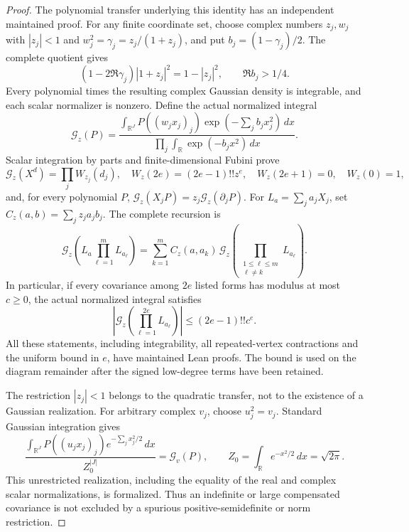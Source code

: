 \begin{proof}
The polynomial transfer underlying this identity has an independent
maintained proof. For any finite coordinate set, choose complex numbers
\(z_j,w_j\) with \(|z_j|<1\) and
\(w_j^2=\gamma_j=z_j/(1+z_j)\), and put
\(b_j=(1-\gamma_j)/2\). The complete quotient gives
\[
 (1-2\Re\gamma_j)|1+z_j|^2=1-|z_j|^2,
 \qquad \Re b_j>1/4.
\]
Every polynomial times the resulting complex Gaussian density is
integrable, and each scalar normalizer is nonzero. Define the actual
normalized integral
\[
 \mathcal G_z(P)=
 \frac{\displaystyle\int_{\mathbb R^J}
      P((w_jx_j)_j)\exp(-\sum_jb_jx_j^2)\,dx}
      {\displaystyle\prod_j\int_{\mathbb R}\exp(-b_jx^2)\,dx}.
\]
Scalar integration by parts and finite-dimensional Fubini prove
\[
 \mathcal G_z(X^d)=\prod_j W_{z_j}(d_j),\quad
 W_z(2e)=(2e-1)!!z^e,\quad W_z(2e+1)=0,\quad W_z(0)=1,
\]
and, for every polynomial \(P\),
\(\mathcal G_z(X_jP)=z_j\mathcal G_z(\partial_jP)\).
For \(L_a=\sum_ja_jX_j\), set
\(C_z(a,b)=\sum_jz_ja_jb_j\). The complete recursion is
\[
 \mathcal G_z\left(L_a\prod_{\ell=1}^mL_{a_\ell}\right)
 =\sum_{k=1}^m C_z(a,a_k)\,
    \mathcal G_z\left(\prod_{\substack{1\leq\ell\leq m\\\ell\ne k}}
                                      L_{a_\ell}\right).
\]
In particular, if every covariance among \(2e\) listed forms has
modulus at most \(c\geq0\), the actual normalized integral satisfies
\[
 \left|\mathcal G_z\left(\prod_{\ell=1}^{2e}L_{a_\ell}\right)\right|
                         \leq(2e-1)!!c^e .
\]
All these statements, including integrability, all repeated-vertex
contractions and the uniform bound in \(e\), have maintained Lean
proofs. The bound is used on the diagram remainder after the signed
low-degree terms have been retained.

The restriction \(|z_j|<1\) belongs to the quadratic transfer, not
to the existence of a Gaussian realization. For arbitrary complex
\(v_j\), choose \(u_j^2=v_j\). Standard Gaussian integration gives
\[
 \frac{\displaystyle\int_{\mathbb R^J}
      P((u_jx_j)_j)e^{-\sum_jx_j^2/2}\,dx}
      {Z_0^{|J|}}=\mathcal G_v(P),\qquad
 Z_0=\int_{\mathbb R}e^{-x^2/2}\,dx=\sqrt{2\pi}.
\]
This unrestricted realization, including the equality of the real and
complex scalar normalizations, is formalized. Thus an indefinite
or large compensated covariance is not excluded by a spurious
positive-semidefinite or norm restriction.


\end{proof}
